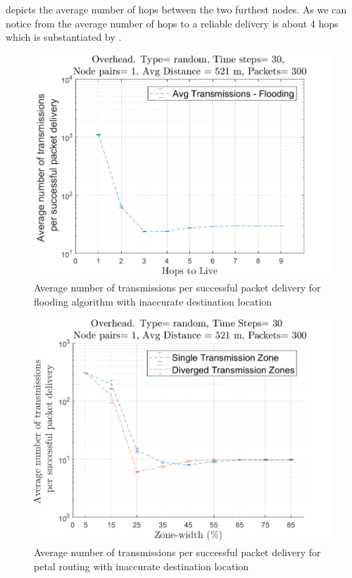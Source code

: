  depicts the average number of hops between the two furthest nodes. As we can notice from  the average number of hops to a reliable delivery is about 4 hops which is substantiated by .

\begin{figure}[hbtp]
\centering
\includegraphics[width=\simResultFigSize\textwidth]{ncsuthesis-0.6/Chapter-5/figs/mob_fl_trans_random.png}
\caption{Average number of transmissions per successful packet delivery for flooding algorithm with inaccurate destination location}
\label{fig:mob_fl_trans_random}
\end{figure}

\begin{figure}[hbtp]
\centering
\includegraphics[width=\simResultFigSize\textwidth]{ncsuthesis-0.6/Chapter-5/figs/mob_pe_trans_random.png}
\caption{Average number of transmissions per successful packet delivery for petal routing with inaccurate destination location}
\label{fig:mob_pe_trans_random}
\end{figure}

